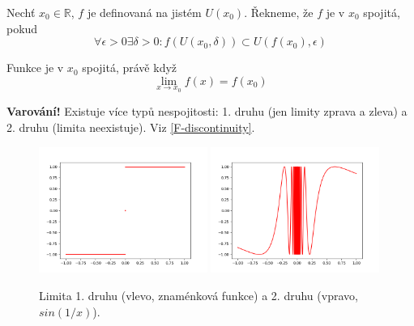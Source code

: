 \begin{definition}[name=Spojitost, label=D-continuity]
    Nechť $x_0\in\mathbb{R}$, $f$ je definovaná na jistém $U(x_0)$. Řekneme, že $f$ je v $x_0$
    spojitá, pokud
    \begin{equation}
        \forall\epsilon>0\exists\delta>0:f\left(U(x_0,\delta)\right)\subset
            U\left(f(x_0),\epsilon\right)
    \end{equation}
\end{definition}

\begin{theorem}[name=Limita a spojitost, label=T-limitAndContinuity]
    Funkce je v $x_0$ spojitá, právě když
    \begin{equation}
        \lim_{x\to x_0}f(x)=f(x_0)
    \end{equation}
\end{theorem}
\textbf{Varování!} Existuje více typů nespojitosti: 1. druhu (jen limity zprava
a zleva) a 2. druhu (limita neexistuje). Viz \autoref{F-discontinuity}.
\begin{figure}[ht!]
    \begin{center}
        \includegraphics[width=0.49\textwidth,keepaspectratio]{../img/chapter2/typesOfDiscontinuity_1.png}
        \includegraphics[width=0.49\textwidth,keepaspectratio]{../img/chapter2/typesOfDiscontinuity_2.png}
        \caption{Limita 1. druhu (vlevo, znaménková funkce) a 2. druhu (vpravo, $sin(1/x)$).}
        \label{F-discontinuity}
    \end{center}
\end{figure}\FloatBarrier
